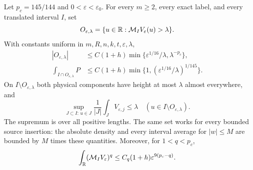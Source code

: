 \begin{theorem}
\label{thm:v56-finite-maximal}
Let $p_c=145/144$ and $0<\varepsilon<\varepsilon_0$. For every
$m\ge2$, every exact label, and every translated interval $I$,
set
\begin{equation}\label{eq:v56-physical-bad-set}
 O_{\varepsilon,\lambda}
       =\{u\in\R:\mathcal M_I V_\varepsilon(u)>\lambda\}.
\end{equation}
With constants uniform in $m,R,n,k,t,\varepsilon,\lambda$,
\begin{align}
 |O_{\varepsilon,\lambda}|
 &\le C(1+h)\min\{
       \varepsilon^{1/16}/\lambda,\lambda^{-p_c}\},
                                      \label{eq:v56-finite-bad-length}\\
 \int_{I\cap O_{\varepsilon,\lambda}}P
 &\le C(1+h)\min\{1,
                  (\varepsilon^{1/16}/\lambda)^{1/145}\}.
                                      \label{eq:v56-finite-bad-source}
\end{align}
On $I\setminus O_{\varepsilon,\lambda}$ both physical components
have height at most $\lambda$ almost everywhere, and
\begin{equation}\label{eq:v56-every-interval}
 \sup_{J\subset I:\,u\in J}\frac1{|J|}
                 \int_J V_{\varepsilon,j}\le\lambda
       \quad(u\in I\setminus O_{\varepsilon,\lambda}).
\end{equation}
The supremum is over all positive lengths. The same set works for
every bounded source insertion: the absolute density and every
interval average for $|w|\le M$ are bounded by $M$ times these
quantities. Moreover, for $1<q<p_c$,
\begin{equation}\label{eq:v56-maximal-physical-Lq}
 \int_{\R}(\mathcal M_I V_\varepsilon)^q
       \le C_q(1+h)\varepsilon^{9(p_c-q)}.
\end{equation}
\end{theorem}
